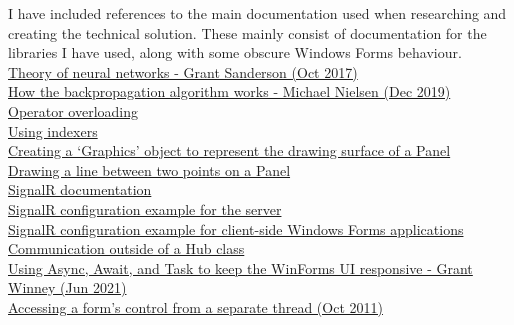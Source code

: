 \documentclass{article}
\begin{document}
I have included references to the main documentation used when researching and creating the technical solution. These mainly consist of documentation for the libraries I have used, along with some obscure Windows Forms behaviour. \\

\href{https://www.3blue1brown.com/topics/neural-networks}{Theory of neural networks - Grant Sanderson (Oct 2017)} \\
\href{http://neuralnetworksanddeeplearning.com/chap2.html}{How the backpropagation algorithm works - Michael Nielsen (Dec 2019)} \\
\href{https://learn.microsoft.com/en-us/dotnet/csharp/language-reference/operators/operator-overloading}{Operator overloading} \\
\href{https://learn.microsoft.com/en-us/dotnet/csharp/programming-guide/indexers/using-indexers}{Using indexers} \\

\href{https://learn.microsoft.com/en-us/dotnet/desktop/winforms/advanced/how-to-create-graphics-objects-for-drawing}{Creating a `Graphics' object to represent the drawing surface of a Panel} \\
\href{https://learn.microsoft.com/en-us/dotnet/desktop/winforms/advanced/how-to-draw-a-line-on-a-windows-form}{Drawing a line between two points on a Panel} \\

\href{https://learn.microsoft.com/en-us/aspnet/core/tutorials/signalr?view=aspnetcore-10.0&tabs=visual-studio#configure-signalr}{SignalR documentation} \\
\href{https://github.com/aspnet/SignalR-samples/tree/main/ChatSample/ChatSample}{SignalR configuration example for the server} \\
\href{https://github.com/aspnet/SignalR-samples/tree/main/WindowsFormsSample}{SignalR configuration example for client-side Windows Forms applications} \\
\href{https://learn.microsoft.com/en-us/aspnet/core/signalr/hubcontext?view=aspnetcore-10.0}{Communication outside of a Hub class} \\

\href{https://grantwinney.com/using-async-await-and-task-to-keep-the-winforms-ui-more-responsive/}{Using Async, Await, and Task to keep the WinForms UI responsive - Grant Winney (Jun 2021)} \\
\href{https://stackoverflow.com/questions/7609839/accessing-a-forms-control-from-a-separate-thread}{Accessing a form's control from a separate thread (Oct 2011)}
\end{document}
